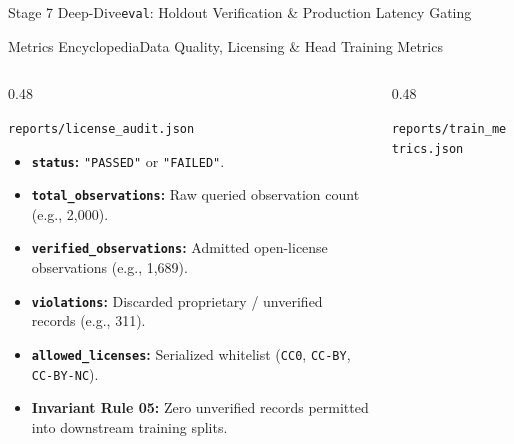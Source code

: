 \begin{frame}{Stage 7 Deep-Dive}{\texttt{eval}: Holdout Verification \& Production Latency Gating}
\end{frame}

\begin{frame}{Metrics Encyclopedia}{Data Quality, Licensing \& Head Training Metrics}
    \begin{columns}[T]
        \begin{column}{0.48\textwidth}
            \begin{block}{\texttt{reports/license\_audit.json}}
                \begin{itemize}\scriptsize
                    \item \textbf{\texttt{status}:} \texttt{"PASSED"} or \texttt{"FAILED"}.
                    \item \textbf{\texttt{total\_observations}:} Raw queried observation count (e.g., 2,000).
                    \item \textbf{\texttt{verified\_observations}:} Admitted open-license observations (e.g., 1,689).
                    \item \textbf{\texttt{violations}:} Discarded proprietary / unverified records (e.g., 311).
                    \item \textbf{\texttt{allowed\_licenses}:} Serialized whitelist (\texttt{CC0}, \texttt{CC-BY}, \texttt{CC-BY-NC}).
                    \item \textbf{Invariant Rule 05:} Zero unverified records permitted into downstream training splits.
                \end{itemize}
            \end{block}
        \end{column}
        \begin{column}{0.48\textwidth}
            \begin{block}{\texttt{reports/train\_metrics.json}}
                \begin{itemize}\scriptsize

\end{itemize}
\end{block}
\end{column}
\end{columns}
\end{frame}
